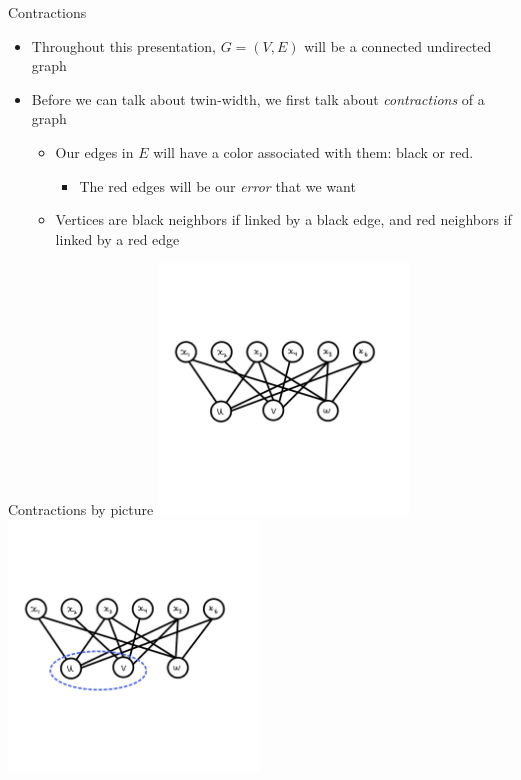 \documentclass[aspectratio=169]{beamer}
\begin{document}
\begin{frame}{Contractions}
    \begin{itemize}
        \item Throughout this presentation, $G = (V, E)$ will be a connected undirected graph \pause
        \item Before we can talk about twin-width, we first talk about \textcolor{sigma@mainblue}{\emph{contractions}} of a graph \pause
        \begin{itemize}
            \item Our edges in $E$ will have a color associated with them: black or \textcolor{sigma@alertred}{red}.
            \begin{itemize}
                \item The red edges will be our \textcolor{sigma@alertred}{\emph{error}} that we want
            \end{itemize}
            \item Vertices are black neighbors if linked by a black edge, and red neighbors if linked by a red edge
        \end{itemize}
    \end{itemize}
\end{frame}

\begin{frame}{Contractions by picture}
    \includegraphics[width=0.5\textwidth]{images/cropped-01.jpg}%
    \includegraphics[width=0.5\textwidth]{images/cropped-02.jpg}
\end{frame}
\end{document}
